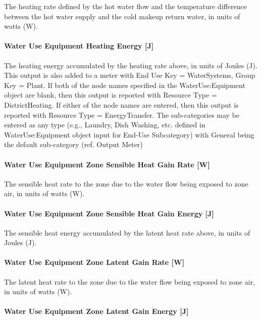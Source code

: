 The heating rate defined by the hot water flow and the temperature difference between the hot water supply and the cold makeup return water, in units of watts (W).

\paragraph{Water Use Equipment Heating Energy {[}J{]}}\label{water-use-equipment-heating-energy-j}

The heating energy accumulated by the heating rate above, in units of Joules (J). This output is also added to a meter with End Use Key = WaterSystems, Group Key = Plant. If both of the node names specified in the WaterUse:Equipment object are blank, then this output is reported with Resource Type = DistrictHeating. If either of the node names are entered, then this output is reported with Resource Type = EnergyTransfer. The sub-categories may be entered as any type (e.g., Laundry, Dish Washing, etc. defined in WaterUse:Equipment object input for End-Use Subcategory) with General being the default sub-category (ref. Output Meter)

\paragraph{Water Use Equipment Zone Sensible Heat Gain Rate {[}W{]}}\label{water-use-equipment-zone-sensible-heat-gain-rate-w}

The sensible heat rate to the zone due to the water flow being exposed to zone air, in units of watts (W).

\paragraph{Water Use Equipment Zone Sensible Heat Gain Energy {[}J{]}}\label{water-use-equipment-zone-sensible-heat-gain-energy-j}

The sensible heat energy accumulated by the latent heat rate above, in units of Joules (J).

\paragraph{Water Use Equipment Zone Latent Gain Rate {[}W{]}}\label{water-use-equipment-zone-latent-gain-rate-w}

The latent heat rate to the zone due to the water flow being exposed to zone air, in units of watts (W).

\paragraph{Water Use Equipment Zone Latent Gain Energy {[}J{]}}\label{water-use-equipment-zone-latent-gain-energy-j}

